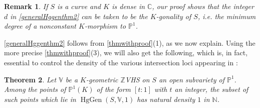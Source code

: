 \documentclass[10pt]{article}
\numberwithin{equation}{section}
\theoremstyle{plain}
\newtheorem{thm}{Theorem}[section]
\newtheorem{rem}[thm]{Remark}
\theoremstyle{definition}
\theoremstyle{remark}
\newcommand{\Z}{\mathbb{Z}}
\newcommand{\V}{\mathbb{V}}
\newcommand{\PP}{\mathbb{P}}
\begin{document}
\begin{rem}
If $S$ is a curve and $K$ is dense in $\mathbb{C}$, our proof shows that the integer $d$ in \autoref{generalHggenthm2} can be taken to be the $K$-gonality of $S$, i.e. the minimum degree of a nonconstant $K$-morphism to $\PP^1$.
\end{rem}






\autoref{generalHggenthm2} follows from \autoref{thmwithproof}(1), as we now explain. Using the more precise \autoref{thmwithproof}(3), we will also get the following, which is, in fact, essential to control the density of the various intersection loci appearing in :


\begin{thm}\label{quantitativeHodgegen}
Let $\V$ be a $K$-geometric $\Z$VHS on $S$ an open subvariety of $\PP^1$. Among the points of $\PP^1(K)$ of the form $[t:1]$ with $t$ an integer, the subset of such points which lie in $\operatorname{HgGen}(S,\V,1)$ has natural density $1$ in $\mathbb{N}$.
\end{thm}
\end{document}
